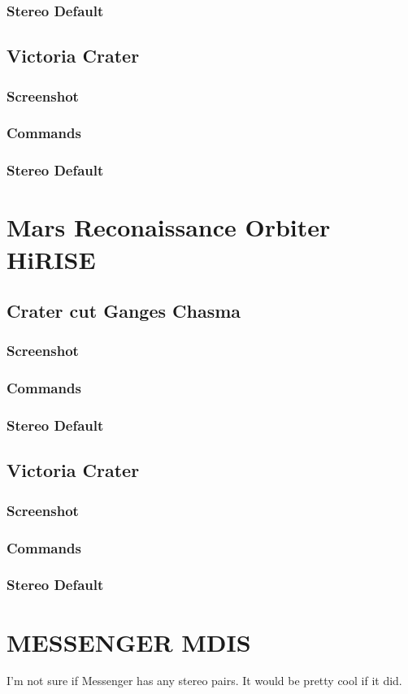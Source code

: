 \subsubsection*{Stereo Default}

\subsection{Victoria Crater}

\subsubsection*{Screenshot}

\subsubsection*{Commands}

\subsubsection*{Stereo Default}

\section{Mars Reconaissance Orbiter HiRISE}

\subsection{Crater cut Ganges Chasma}

\subsubsection*{Screenshot}

\subsubsection*{Commands}

\subsubsection*{Stereo Default}

\subsection{Victoria Crater}

\subsubsection*{Screenshot}

\subsubsection*{Commands}

\subsubsection*{Stereo Default}

\section{MESSENGER MDIS}

I'm not sure if Messenger has any stereo pairs. It would be pretty
cool if it did.
